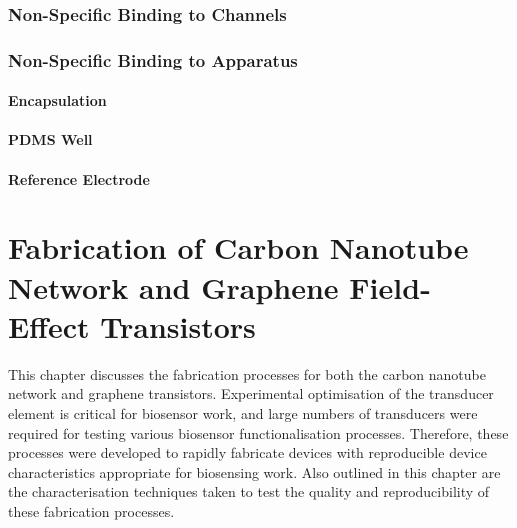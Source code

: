 \documentclass[
  a4paper,
]{scrbook}
\begin{document}
\hypertarget{non-specific-binding-to-channels}{%
\subsection{Non-Specific Binding to
Channels}\label{non-specific-binding-to-channels}}

\hypertarget{non-specific-binding-to-apparatus}{%
\subsection{Non-Specific Binding to
Apparatus}\label{non-specific-binding-to-apparatus}}

\hypertarget{encapsulation}{%
\subsubsection*{Encapsulation}\label{encapsulation}}

\hypertarget{pdms-well}{%
\subsubsection*{PDMS Well}\label{pdms-well}}

\hypertarget{reference-electrode}{%
\subsubsection*{Reference Electrode}\label{reference-electrode}}


\hypertarget{sec-fabrication}{%
\chapter{Fabrication of Carbon Nanotube Network and Graphene
Field-Effect Transistors}\label{sec-fabrication}}

This chapter discusses the fabrication processes for both the carbon
nanotube network and graphene transistors. Experimental optimisation of
the transducer element is critical for biosensor work, and large numbers
of transducers were required for testing various biosensor
functionalisation processes. Therefore, these processes were developed
to rapidly fabricate devices with reproducible device characteristics
appropriate for biosensing work. Also outlined in this chapter are the
characterisation techniques taken to test the quality and
reproducibility of these fabrication processes.
\end{document}
